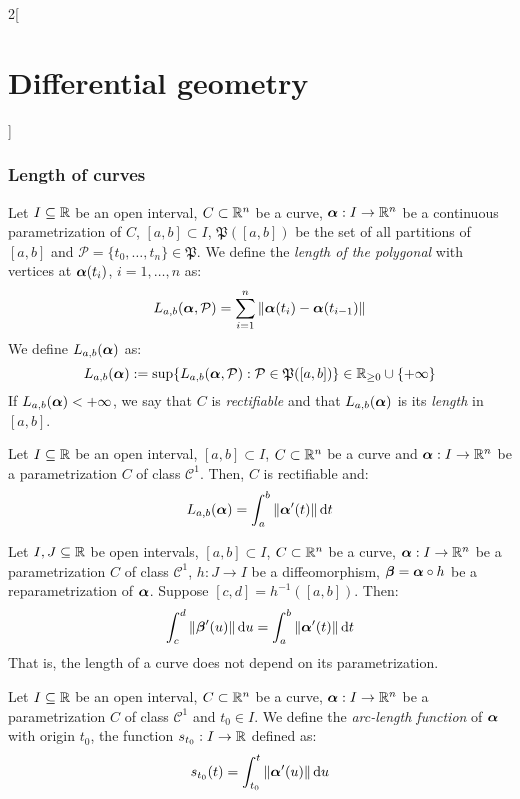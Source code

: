 \documentclass[../../../main.tex]{subfiles}
\begin{document}
\begin{multicols}{2}[\section{Differential geometry}]
  \subsubsection{Length of curves}
  \begin{definition}
    Let $I\subseteq\mathbb{R}$ be an open interval, $C\subset\mathbb{R}^n$ be a curve, $\boldsymbol{\mathrm{\alpha}}:I\rightarrow\mathbb{R}^n$ be a continuous parametrization of $C$, $[a,b]\subset I$, $\mathfrak{P}([a,b])$ be the set of all partitions of $[a,b]$ and $\mathcal{P}=\{t_0,\ldots,t_n\}\in\mathfrak{P}$. We define the \emph{length of the polygonal} with vertices at $\boldsymbol{\mathrm{\alpha}}(t_i)$, $i=1,\ldots,n$ as: $$L_{a,b}(\boldsymbol{\mathrm{\alpha}},\mathcal{P})=\sum_{i=1}^n\|\boldsymbol{\mathrm{\alpha}}(t_i)-\boldsymbol{\mathrm{\alpha}}(t_{i-1})\|$$ We define $L_{a,b}(\boldsymbol{\mathrm{\alpha}})$ as:
    $$L_{a,b}(\boldsymbol{\mathrm{\alpha}}):=\sup\{L_{a,b}(\boldsymbol{\mathrm{\alpha}},\mathcal{P}):\mathcal{P}\in\mathfrak{P}([a,b])\}\in\mathbb{R}_{\geq 0}\cup\{+\infty\}$$ If $L_{a,b}(\boldsymbol{\mathrm{\alpha}})<+\infty$, we say that $C$ is \emph{rectifiable} and that $L_{a,b}(\boldsymbol{\mathrm{\alpha}})$ is its \emph{length} in $[a,b]$.
  \end{definition}
  \begin{proposition}
    Let $I\subseteq\mathbb{R}$ be an open interval, $[a,b]\subset I$, $C\subset\mathbb{R}^n$ be a curve and $\boldsymbol{\mathrm{\alpha}}:I\rightarrow\mathbb{R}^n$ be a parametrization $C$ of class $\mathcal{C}^1$. Then, $C$ is rectifiable and: $$L_{a,b}(\boldsymbol{\mathrm{\alpha}})=\int_a^b\|\boldsymbol{\mathrm{\alpha}}'(t)\|\dd{t}$$
  \end{proposition}
  \begin{proposition}
    Let $I,J\subseteq\mathbb{R}$ be open intervals, $[a,b]\subset I$, $C\subset\mathbb{R}^n$ be a curve, $\boldsymbol{\mathrm{\alpha}}:I\rightarrow\mathbb{R}^n$ be a parametrization $C$ of class $\mathcal{C}^1$, $h:J\rightarrow I$ be a diffeomorphism, $\boldsymbol{\mathrm{\beta}}=\boldsymbol{\mathrm{\alpha}}\circ h$ be a reparametrization of $\boldsymbol{\mathrm{\alpha}}$. Suppose $[c,d]=h^{-1}([a,b])$. Then: $$\int_c^d\|\boldsymbol{\mathrm{\beta}}'(u)\|\dd{u}=\int_a^b\|\boldsymbol{\mathrm{\alpha}}'(t)\|\dd{t}$$ That is, the length of a curve does not depend on its parametrization.
  \end{proposition}
  \begin{definition}
    Let $I\subseteq\mathbb{R}$ be an open interval, $C\subset\mathbb{R}^n$ be a curve, $\boldsymbol{\mathrm{\alpha}}:I\rightarrow\mathbb{R}^n$ be a parametrization $C$ of class $\mathcal{C}^1$ and $t_0\in I$. We define the \emph{arc-length function} of $\boldsymbol{\mathrm{\alpha}}$ with origin ${t_0}$, the function $s_{t_0}:I\rightarrow\mathbb{R}$ defined as: $$s_{t_0}(t)=\int_{t_0}^t\|\boldsymbol{\mathrm{\alpha}}'(u)\|\dd{u}$$
  \end{definition}
  \begin{definition}

\end{definition}
\end{multicols}
\end{document}
